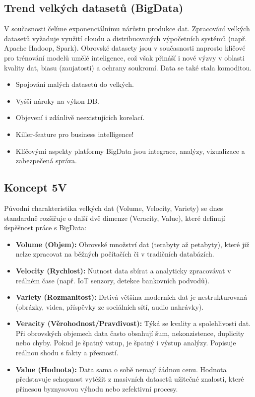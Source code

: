 \subsection{Trend velkých datasetů (BigData)}
V současnosti čelíme exponenciálnímu nárůstu produkce dat. Zpracování velkých 
datasetů vyžaduje využití cloudu a distribuovaných výpočetních systémů 
(např. Apache Hadoop, Spark). Obrovské datasety jsou v současnosti naprosto 
klíčové pro trénování modelů umělé inteligence, což však přináší i nové výzvy v 
oblasti kvality dat, biasu (zaujatosti) a ochrany soukromí. Data se také stala komoditou.
\begin{itemize}
\item Spojování malých datasetů do velkých.
\item Vyšší nároky na výkon DB.
\item Objevení i zdánlivě neexistujících korelací.
\item Killer-feature pro business intelligence!
\item Klíčovými aspekty platformy BigData jsou integrace, analýzy, vizualizace a zabezpečená správa.
\end{itemize}

\subsection{Koncept 5V}
Původní charakteristika velkých dat (Volume, Velocity, Variety) se dnes standardně rozšiřuje o další dvě dimenze (Veracity, Value), které definují úspěšnost práce s BigData:
\begin{itemize}
    \item \textbf{Volume (Objem):} Obrovské množství dat (terabyty až petabyty), které již nelze zpracovat na běžných počítačích či v tradičních databázích.
    \item \textbf{Velocity (Rychlost):} Nutnost data sbírat a analyticky zpracovávat v reálném čase (např. IoT senzory, detekce bankovních podvodů).
    \item \textbf{Variety (Rozmanitost):} Drtivá většina moderních dat je nestrukturovaná (obrázky, videa, příspěvky ze sociálních sítí, audio nahrávky).
    \item \textbf{Veracity (Věrohodnost/Pravdivost):} Týká se kvality a spolehlivosti dat. Při obrovských objemech data často obsahují šum, nekonzistence, duplicity nebo chyby. Pokud je špatný vstup, je špatný i výstup analýzy. Popisuje reálnou shodu s fakty a přesností.
    \item \textbf{Value (Hodnota):} Data sama o sobě nemají žádnou cenu. Hodnota představuje schopnost vytěžit z masivních datasetů užitečné znalosti, které přinesou byznysovou výhodu nebo zefektivní procesy.
\end{itemize}

